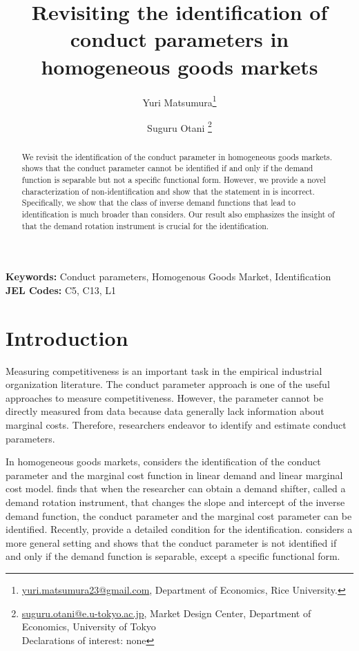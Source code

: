 \documentclass[11pt, a4paper]{article}
\title{Revisiting the identification of conduct parameters in homogeneous goods markets}
\author{Yuri Matsumura\thanks{\href{mailto:}{yuri.matsumura23@gmail.com}, Department of Economics, Rice University.} \and Suguru Otani \thanks{\href{mailto:}{suguru.otani@e.u-tokyo.ac.jp}, Market Design Center, Department of Economics, University of Tokyo
\\Declarations of interest: none %
}}
\theoremstyle{remark}
\begin{document}
\maketitle
\begin{abstract}
    We revisit the identification of the conduct parameter in homogeneous goods markets.
    \citet{lau1982identifying} shows that the conduct parameter cannot be identified if and only if the demand function is separable but not a specific functional form.
    However, we provide a novel characterization of non-identification and show that the statement in \citet{lau1982identifying} is incorrect.
    Specifically, we show that the class of inverse demand functions that lead to identification is much broader than \citet{lau1982identifying} considers.
    Our result also emphasizes the insight of \citet{bresnahan1982oligopoly} that the demand rotation instrument is crucial for the identification.
\end{abstract}

\noindent\textbf{Keywords:} Conduct parameters, Homogenous Goods Market, Identification
\vspace{0in}
\newline
\noindent\textbf{JEL Codes:} C5, C13, L1

\bigskip





\section{Introduction}
Measuring competitiveness is an important task in the empirical industrial organization literature.
The conduct parameter approach is one of the useful approaches to measure competitiveness.
However, the parameter cannot be directly measured from data because data generally lack information about marginal costs.
Therefore, researchers endeavor to identify and estimate conduct parameters.

In homogeneous goods markets, \cite{bresnahan1982oligopoly} considers the identification of the conduct parameter and the marginal cost function in linear demand and linear marginal cost model.
\citet{bresnahan1982oligopoly} finds that when the researcher can obtain a demand shifter, called a demand rotation instrument, that changes the slope and intercept of the inverse demand function, the conduct parameter and the marginal cost parameter can be identified.
Recently, \citet{matsumura2023resolving} provide a detailed condition for the identification.
\citet{lau1982identifying} considers a more general setting and shows that the conduct parameter is not identified if and only if the demand function is separable, except a specific functional form.
\end{document}
